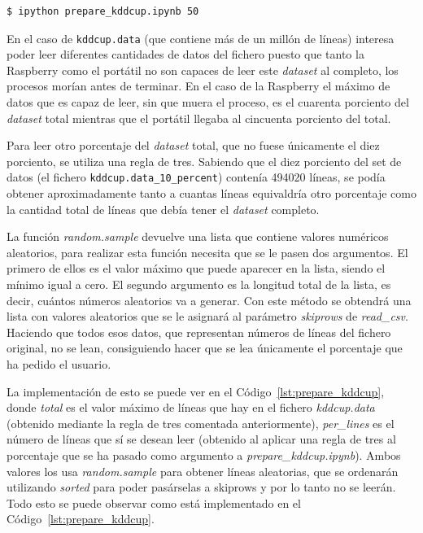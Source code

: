\documentclass[a4paper, 12pt]{book}
\begin{document}
\begin{lstlisting}[language=bash]
    $ ipython prepare_kddcup.ipynb 50
\end{lstlisting}

En el caso de \texttt{kddcup.data} (que contiene más de un millón de líneas) interesa poder leer diferentes cantidades de datos del fichero puesto que tanto la Raspberry como el portátil no son capaces de leer este \textit{dataset} al completo, los procesos morían antes de terminar. En el caso de la Raspberry el máximo de datos que es capaz de leer, sin que muera el proceso, es el cuarenta porciento del \textit{dataset} total mientras que el portátil llegaba al cincuenta porciento del total.

Para leer otro porcentaje del \textit{dataset} total, que no fuese únicamente el diez porciento, se utiliza una regla de tres. Sabiendo que el diez porciento del set de datos (el fichero \texttt{kddcup.data\_10\_percent}) contenía 494020 líneas, se podía obtener aproximadamente tanto a cuantas líneas equivaldría otro porcentaje como la cantidad total de líneas que debía tener el \textit{dataset} completo.

La función \textit{random.sample} devuelve una lista que contiene valores numéricos aleatorios, para realizar esta función necesita que se le pasen dos argumentos. El primero de ellos es el valor máximo que puede aparecer en la lista, siendo el mínimo igual a cero. El segundo argumento es la longitud total de la lista, es decir, cuántos números aleatorios va a generar. Con este método se obtendrá una lista con valores aleatorios que se le asignará al parámetro \textit{skiprows} de \textit{read\_csv}. Haciendo que todos esos datos, que representan números de líneas del fichero original, no se lean, consiguiendo hacer que se lea únicamente el porcentaje que ha pedido el usuario.

La implementación de esto se puede ver en el Código~\ref{lst:prepare_kddcup}, donde \textit{total} es el valor máximo de líneas que hay en el fichero \textit{kddcup.data} (obtenido mediante la regla de tres comentada anteriormente), \textit{per\_lines} es el número de líneas que sí se desean leer (obtenido al aplicar una regla de tres al porcentaje que se ha pasado como argumento a \textit{prepare\_kddcup.ipynb}). Ambos valores los usa \textit{random.sample} para obtener líneas aleatorias, que se ordenarán utilizando \textit{sorted} para poder pasárselas a skiprows y por lo tanto no se leerán. Todo esto se puede observar como está implementado en el Código~\ref{lst:prepare_kddcup}.
\end{document}
